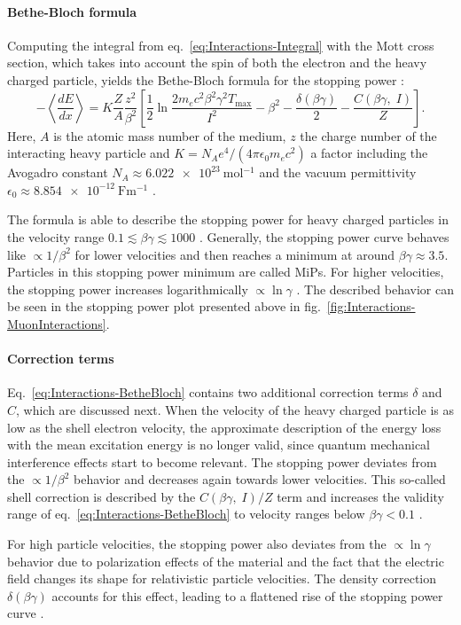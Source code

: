 \paragraph{Bethe-Bloch formula}
Computing the integral from eq.\ \ref{eq:Interactions-Integral} with the Mott cross section, which takes into account the spin of both the electron and the heavy charged particle, yields the Bethe-Bloch formula for the stopping power \cite{Book-KolanoskiWermes,PDG2024}:
\begin{equation}
    -\left\langle \frac{dE}{dx} \right\rangle = K\frac{Z}{A}\frac{z^2}{\beta^2}\left[ \frac{1}{2}\ln\frac{2m_ec^2\beta^2\gamma^2T_\text{max}}{I^2}-\beta^2-\frac{\delta(\beta\gamma)}{2}-\frac{C(\beta\gamma,\;I)}{Z} \right].
    \label{eq:Interactions-BetheBloch}
\end{equation}
Here, $A$ is the atomic mass number of the medium, $z$ the charge number of the interacting heavy particle and $K= N_Ae^4/(4\pi \epsilon_0 m_e c^2)$ a factor including the Avogadro constant $N_A\approx\SI{6.022e23}{\mole^{-1}}$ and the vacuum permittivity $\epsilon_0\approx\SI{8.854e-12}{\farad\meter^{-1}}$ \cite{PDG2024}. 
\par The formula is able to describe the stopping power for heavy charged particles in the velocity range $0.1 \lesssim \beta\gamma \lesssim 1000$ \cite{PDG2024}. Generally, the stopping power curve behaves like $\propto 1/\beta^2$ for lower velocities and then reaches a minimum at around $\beta\gamma\approx 3.5$. Particles in this stopping power minimum are called \acp{MiP}. For higher velocities, the stopping power increases logarithmically $\propto\ln\gamma$ \cite{Book-KolanoskiWermes,PDG2024}. The described behavior can be seen in the stopping power plot presented above in fig.\ \ref{fig:Interactions-MuonInteractions}.
\paragraph{Correction terms}
Eq.\ \ref{eq:Interactions-BetheBloch} contains two additional correction terms $\delta$ and $C$, which are discussed next. When the velocity of the heavy charged particle is as low as the shell electron velocity, the approximate description of the energy loss with the mean excitation energy is no longer valid, since quantum mechanical interference effects start to become relevant. The stopping power deviates from the $\propto 1/\beta^2$ behavior and decreases again towards lower velocities. This so-called shell correction is described by the $C(\beta\gamma,\; I)/Z$ term and increases the validity range of eq.\ \ref{eq:Interactions-BetheBloch} to velocity ranges below $\beta\gamma < 0.1$ \cite{Book-KolanoskiWermes,PDG2024}.
\par For high particle velocities, the stopping power also deviates from the $\propto\ln\gamma$ behavior due to polarization effects of the material and the fact that the electric field changes its shape for relativistic particle velocities. The density correction $\delta(\beta\gamma)$ accounts for this effect, leading to a flattened rise of the stopping power curve \cite{Book-KolanoskiWermes,PDG2024}.
